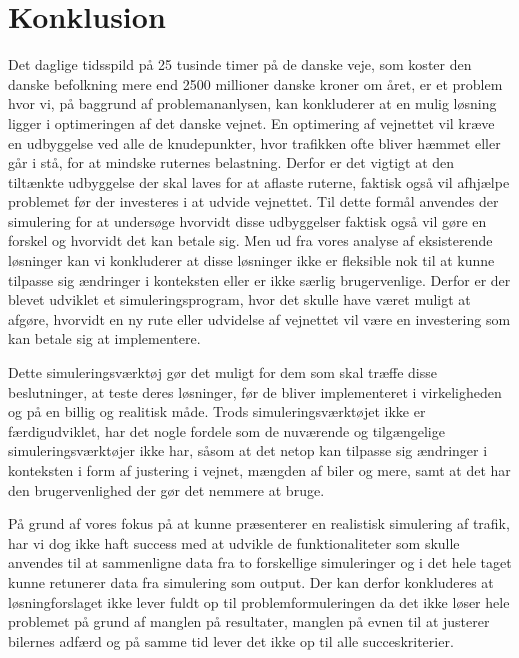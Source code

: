 \chapter{Konklusion}\label{Konklusion}
Det daglige tidsspild på 25 tusinde timer på de danske veje, som koster den danske befolkning mere end 2500 millioner danske kroner om året, er et problem hvor vi, på baggrund af problemananlysen, kan konkluderer at en mulig løsning ligger i optimeringen af det danske vejnet. En optimering af vejnettet vil kræve en udbyggelse ved alle de knudepunkter, hvor trafikken ofte bliver hæmmet eller går i stå, for at mindske ruternes belastning. Derfor er det vigtigt at den tiltænkte udbyggelse der skal laves for at aflaste ruterne, faktisk også vil afhjælpe problemet før der investeres i at udvide vejnettet. Til dette formål anvendes der simulering for at undersøge hvorvidt disse udbyggelser faktisk også vil gøre en forskel og hvorvidt det kan betale sig. Men ud fra vores analyse af eksisterende løsninger kan vi konkluderer at disse løsninger ikke er fleksible nok til at kunne tilpasse sig ændringer i konteksten eller er ikke særlig brugervenlige. Derfor er der blevet udviklet et simuleringsprogram, hvor det skulle have været muligt at afgøre, hvorvidt en ny rute eller udvidelse af vejnettet vil være en investering som kan betale sig at implementere. 

\vspace{5mm}
 Dette simuleringsværktøj gør det muligt for dem som skal træffe disse beslutninger, at teste deres løsninger, før de bliver implementeret i virkeligheden og på en billig og realitisk måde. Trods simuleringsværktøjet ikke er færdigudviklet, har det nogle fordele som de nuværende og tilgængelige  simuleringsværktøjer ikke har, såsom at det netop kan tilpasse sig ændringer i konteksten i form af justering i vejnet, mængden af biler og mere, samt at det har den brugervenlighed der gør det nemmere at bruge.

\vspace{5mm} 
På grund af vores fokus på at kunne præsenterer en realistisk simulering af trafik, har vi dog ikke haft success med at udvikle de funktionaliteter som skulle anvendes til at sammenligne data fra to forskellige simuleringer og i det hele taget kunne retunerer data fra simulering som output. Der kan derfor konkluderes at løsningforslaget ikke lever fuldt op til problemformuleringen da det ikke løser hele problemet på grund af manglen på resultater, manglen på evnen til at justerer bilernes adfærd og på samme tid lever det ikke op til alle succeskriterier. 